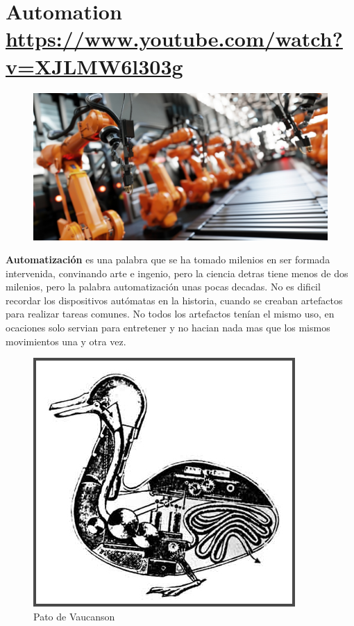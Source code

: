 \documentclass[
	12pt, %
]{fphw}
\begin{document}
\newpage
\section*{{\color{Cerulean} Automation} \url{https://www.youtube.com/watch?v=XJLMW6l303g}}

\begin{figure}[H]
  \centering
  \includegraphics[scale=0.3]{images/automation.jpg}
\end{figure}


\textbf{Automatización} es una palabra que se ha tomado milenios en ser formada intervenida, convinando arte e ingenio, pero la ciencia detras tiene menos de dos milenios, pero la palabra automatización unas pocas decadas. No es dificil recordar los dispositivos autómatas en la historia, cuando se creaban artefactos para realizar tareas comunes. No todos los artefactos tenían el mismo uso, en ocaciones solo servian para entretener y no hacian nada mas que los mismos movimientos una y otra vez.

\begin{figure}[H]
  \centering
  \includegraphics[scale=0.6]{images/pato.jpg}
  \caption{Pato de Vaucanson}
\end{figure}
\end{document}
